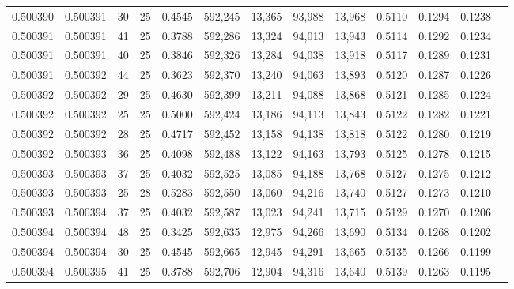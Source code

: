 \begin{tabular}{rrrrrrrrrrrrr}
0.500390 & 0.500391 &    30 &  25 &                                     0.4545 & 592,245 &  13,365 &  93,988 &  13,968 & 0.5110 & 0.1294 & 0.1238 \\
0.500391 & 0.500391 &    41 &  25 &                                     0.3788 & 592,286 &  13,324 &  94,013 &  13,943 & 0.5114 & 0.1292 & 0.1234 \\
0.500391 & 0.500391 &    40 &  25 &                                     0.3846 & 592,326 &  13,284 &  94,038 &  13,918 & 0.5117 & 0.1289 & 0.1231 \\
0.500391 & 0.500392 &    44 &  25 &                                     0.3623 & 592,370 &  13,240 &  94,063 &  13,893 & 0.5120 & 0.1287 & 0.1226 \\
0.500392 & 0.500392 &    29 &  25 &                                     0.4630 & 592,399 &  13,211 &  94,088 &  13,868 & 0.5121 & 0.1285 & 0.1224 \\
0.500392 & 0.500392 &    25 &  25 &                                     0.5000 & 592,424 &  13,186 &  94,113 &  13,843 & 0.5122 & 0.1282 & 0.1221 \\
0.500392 & 0.500392 &    28 &  25 &                                     0.4717 & 592,452 &  13,158 &  94,138 &  13,818 & 0.5122 & 0.1280 & 0.1219 \\
0.500392 & 0.500393 &    36 &  25 &                                     0.4098 & 592,488 &  13,122 &  94,163 &  13,793 & 0.5125 & 0.1278 & 0.1215 \\
0.500393 & 0.500393 &    37 &  25 &                                     0.4032 & 592,525 &  13,085 &  94,188 &  13,768 & 0.5127 & 0.1275 & 0.1212 \\
0.500393 & 0.500393 &    25 &  28 &                                     0.5283 & 592,550 &  13,060 &  94,216 &  13,740 & 0.5127 & 0.1273 & 0.1210 \\
0.500393 & 0.500394 &    37 &  25 &                                     0.4032 & 592,587 &  13,023 &  94,241 &  13,715 & 0.5129 & 0.1270 & 0.1206 \\
0.500394 & 0.500394 &    48 &  25 &                                     0.3425 & 592,635 &  12,975 &  94,266 &  13,690 & 0.5134 & 0.1268 & 0.1202 \\
0.500394 & 0.500394 &    30 &  25 &                                     0.4545 & 592,665 &  12,945 &  94,291 &  13,665 & 0.5135 & 0.1266 & 0.1199 \\
0.500394 & 0.500395 &    41 &  25 &                                     0.3788 & 592,706 &  12,904 &  94,316 &  13,640 & 0.5139 & 0.1263 & 0.1195 \\

\end{tabular}
